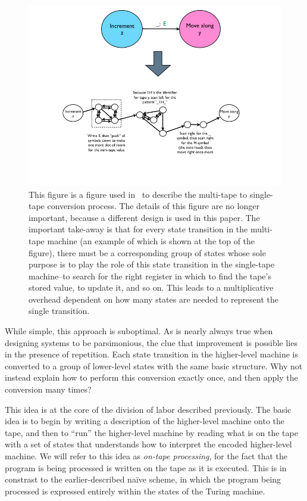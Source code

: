 \documentclass[11pt]{article}
\begin{document}
\begin{figure} 
\begin{center} 
\includegraphics[scale=0.42]{figs/mttost.png}
\caption{This figure is a figure used in~\cite{thesis} to describe the multi-tape to single-tape conversion process. The details of this figure are no longer important, because a different design is used in this paper. The important take-away is that for every state transition in the multi-tape machine (an example of which is shown at the top of the figure), there must be a corresponding group of states whose sole purpose is to play the role of this state transition in the single-tape machine--to search for the right register in which to find the tape's stored value, to update it, and so on. This leads to a multiplicative overhead dependent on how many states are needed to represent the single transition.  \label{fig:mttost}} 
\end{center} 
\end{figure}

While simple, this approach is suboptimal. As is nearly always true when designing systems to be parsimonious, the clue that improvement is possible lies in the presence of repetition. Each state transition in the higher-level machine is converted to a group of lower-level states with the same basic structure. Why not instead explain how to perform this conversion exactly once, and then apply the conversion many times?

This idea is at the core of the division of labor described previously. The basic idea is to begin by writing a description of the higher-level machine onto the tape, and then to ``run'' the higher-level machine by reading what is on the tape with a set of states that understands how to interpret the encoded higher-level machine. We will refer to this idea as \emph{on-tape processing}, for the fact that the program is being processed is written on the tape as it is executed. This is in constrast to the earlier-described na\"ive scheme, in which the program being processed is expressed entirely within the states of the Turing machine.
\end{document}
